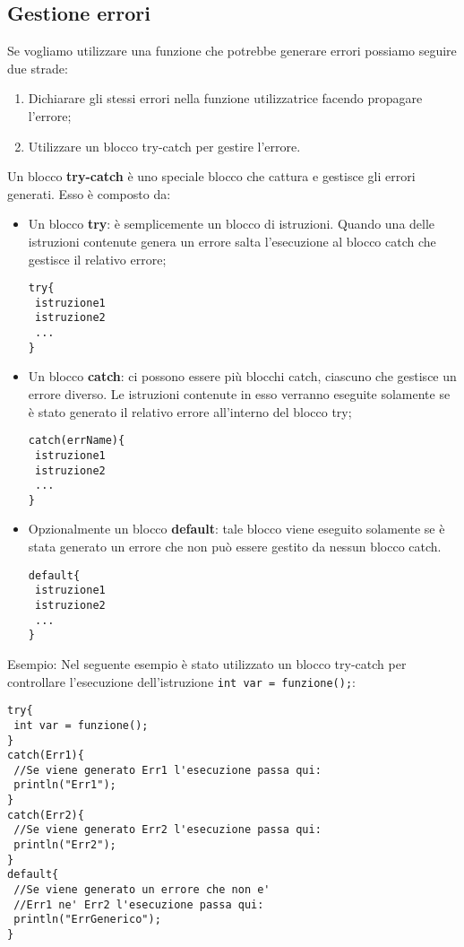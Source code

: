 \documentclass[10pt]{book}%
\newcommand{\e}{\`{e} }
\newcommand{\ac}[1]{\`{#1}}
\newcommand{\code}[1]{\texttt{#1}}
\renewcommand{\emph}[1]{\textbf{#1}}
\newenvironment{codeenv}{
\begin{mdframed}[backgroundcolor=black!20,topline=false,leftline=false,rightline=false,bottomline=false]
}
{\end{mdframed}}
\begin{document}
\subsection{Gestione errori}
Se vogliamo utilizzare una funzione che potrebbe generare errori possiamo seguire due strade:
\begin{enumerate}
\item Dichiarare gli stessi errori nella funzione utilizzatrice facendo propagare l'errore;
\item Utilizzare un blocco try-catch per gestire l'errore. 
\end{enumerate}
Un blocco \emph{try-catch} \e uno speciale blocco che cattura e gestisce gli errori generati. Esso \e composto da:
\begin{itemize}
\item Un blocco \emph{try}: \e semplicemente un blocco di istruzioni. Quando una delle istruzioni contenute genera un errore salta l'esecuzione al blocco catch che gestisce il relativo errore;
\begin{codeenv}
\begin{verbatim}
try{
 istruzione1
 istruzione2
 ...
}
\end{verbatim}
\end{codeenv}
\item Un blocco \emph{catch}: ci possono essere pi\ac u blocchi catch, ciascuno che gestisce un errore diverso. Le istruzioni contenute in esso verranno eseguite solamente se \e stato generato il relativo errore all'interno del blocco try;
\begin{codeenv}
\begin{verbatim}
catch(errName){
 istruzione1
 istruzione2
 ...
}
\end{verbatim}
\end{codeenv}
\item Opzionalmente un blocco \emph{default}: tale blocco viene eseguito solamente se \e stata generato un errore che non pu\ac o essere gestito da nessun blocco catch.
\begin{codeenv}
\begin{verbatim}
default{
 istruzione1
 istruzione2
 ...
}
\end{verbatim}
\end{codeenv}
\end{itemize}

Esempio: Nel seguente esempio \e stato utilizzato un blocco try-catch per controllare l'esecuzione dell'istruzione \code{int var = funzione();}:

\begin{codeenv}
\begin{verbatim}
try{
 int var = funzione();
}
catch(Err1){
 //Se viene generato Err1 l'esecuzione passa qui:
 println("Err1");
}
catch(Err2){
 //Se viene generato Err2 l'esecuzione passa qui:
 println("Err2");
}
default{
 //Se viene generato un errore che non e' 
 //Err1 ne' Err2 l'esecuzione passa qui:
 println("ErrGenerico");
}
\end{verbatim}
\end{codeenv}
\end{document}
